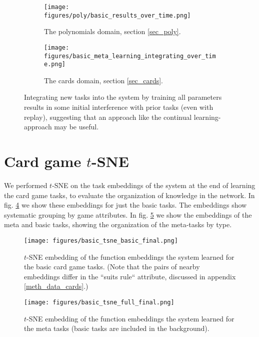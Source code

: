 \begin{figure}[H]
\centering
\begin{subfigure}[t]{0.5\textwidth}
\texttt{[image: figures/poly/basic\_results\_over\_time.png]}
\caption{The polynomials domain, section \ref{sec_poly}.}
\label{supp_poly_integration_results}
\end{subfigure}%
\begin{subfigure}[t]{0.5\textwidth}
\texttt{[image: figures/basic\_meta\_learning\_integrating\_over\_time.png]}
\caption{The cards domain, section \ref{sec_cards}.}
\label{supp_cards_integration_results}
\end{subfigure}%
\caption{Integrating new tasks into the system by training all parameters results in some initial interference with prior tasks (even with replay), suggesting that an approach like the continual learning-approach may be useful.}
\label{supp_integration_results}
\end{figure}

\section{Card game $t$-SNE} \label{app_cards_tsne}
We performed $t$-SNE \citep{LaurensvanderMaaten2008} on the task embeddings of the system at the end of learning the card game tasks, to evaluate the organization of knowledge in the network. In fig. \ref{fig_cards_tsne_basic} we show these embeddings for just the basic tasks. The embeddings show systematic grouping by game attributes. In fig. \ref{fig_cards_tsne_full} we show the embeddings of the meta and basic tasks, showing the organization of the meta-tasks by type. \par 
\begin{figure}[H]
\centering
\texttt{[image: figures/basic\_tsne\_basic\_final.png]}
\caption{$t$-SNE embedding of the function embeddings the system learned for the basic card game tasks. (Note that the pairs of nearby embeddings differ in the ``suits rule`` attribute, discussed in appendix \ref{meth_data_cards}.)} 
\label{fig_cards_tsne_basic}
\end{figure}%
\begin{figure}[H]
\centering
\texttt{[image: figures/basic\_tsne\_full\_final.png]}
\caption{$t$-SNE embedding of the function embeddings the system learned for the meta tasks (basic tasks are included in the background).} 
\label{fig_cards_tsne_full}
\end{figure}

